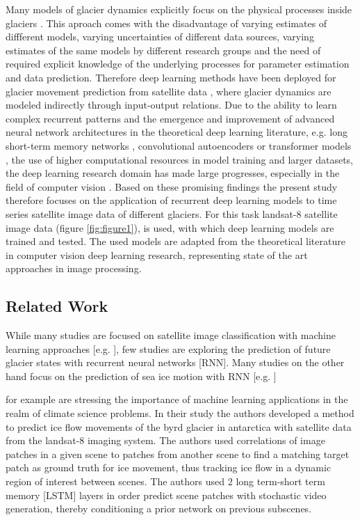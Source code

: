 \documentclass[12pt]{article}
\begin{document}
Many models of glacier dynamics explicitly focus on the physical processes inside glaciers \citep{colgan2016glacier, berthier2023measuring}. This aproach comes with the disadvantage of varying estimates of diffferent models, varying uncertainties of different data sources, varying estimates of the same models by different research groups and the need of required explicit knowledge of the underlying processes for parameter estimation and data prediction. Therefore deep learning methods have been deployed for glacier movement prediction from satellite data \citep{min2019predicting}, where glacier dynamics are modeled indirectly through input-output relations. Due to the ability to learn complex recurrent patterns and the emergence and improvement of advanced neural network architectures in the theoretical deep learning literature, e.g. long short-term memory networks \citep{hochreiter1997long}, convolutional autoencoders \citep{DBLP:journals/corr/RonnebergerFB15} or transformer models \citep{vaswani2017attention}, the use of higher computational resources in model training \citep{anthony2020carbontracker} and larger datasets, the deep learning research domain has made large progresses, especially in the field of computer vision \citep{chai2021deep}. Based on these promising findings the present study therefore focuses on the application of recurrent deep learning models to time series satellite image data of different glaciers. For this task landsat-8 satellite image data (figure \ref{fig:figure1}), is used, with which deep learning models are trained and tested. The used models are adapted from the theoretical literature in computer vision deep learning research, representing state of the art approaches in image processing.

\subsection{Related Work}

While many studies are focused on satellite image classification with machine learning approaches [e.g. \citet{chu2022glacier, marochovautomated, prieur2022machine}], few studies are exploring the prediction of future glacier states with recurrent neural networks [RNN]. Many studies on the other hand focus on the prediction of sea ice motion with RNN [e.g. \citet{mu2023icetft, zhai2021machine, petrou2017prediction, petrou2019prediction}]

\citet{min2019predicting} for example are stressing the importance of machine learning applications in the realm of climate science problems. In their study the authors developed a method to predict ice flow movements of the byrd glacier in antarctica with satellite data from the landsat-8 imaging system. The authors used correlations of image patches in a given scene to patches from another scene to find a matching target patch as ground truth for ice movement, thus tracking ice flow in a dynamic region of interest between scenes. The authors used 2 long term-short term memory [LSTM] layers in order predict scene patches with stochastic video generation, thereby conditioning a prior network on previous subscenes. 
\end{document}
